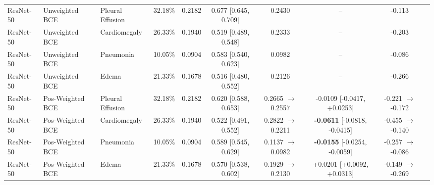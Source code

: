 \documentclass[preprint,12pt]{elsarticle}
\begin{document}
\begin{table}[!htbp]
{\begin{tabular}{lllccccccc}
\midrule
ResNet-50 & Unweighted BCE & Pleural Effusion & 32.18\% & 0.2182 & 0.677 [0.645, 0.709] & 0.2430 & -- & -0.113 \\
ResNet-50 & Unweighted BCE & Cardiomegaly & 26.33\% & 0.1940 & 0.519 [0.489, 0.548] & 0.2333 & -- & -0.203 \\
ResNet-50 & Unweighted BCE & Pneumonia & 10.05\% & 0.0904 & 0.583 [0.540, 0.623] & 0.0982 & -- & -0.086 \\
ResNet-50 & Unweighted BCE & Edema & 21.33\% & 0.1678 & 0.516 [0.480, 0.552] & 0.2126 & -- & -0.266 \\
\midrule
ResNet-50 & Pos-Weighted BCE & Pleural Effusion & 32.18\% & 0.2182 & 0.620 [0.588, 0.653] & 0.2665 $\to$ 0.2557 & -0.0109 [-0.0417, +0.0253] & -0.221 $\to$ -0.172 \\
ResNet-50 & Pos-Weighted BCE & Cardiomegaly & 26.33\% & 0.1940 & 0.522 [0.491, 0.552] & 0.2822 $\to$ 0.2211 & \textbf{-0.0611} [-0.0818, -0.0415] & -0.455 $\to$ -0.140 \\
ResNet-50 & Pos-Weighted BCE & Pneumonia & 10.05\% & 0.0904 & 0.589 [0.545, 0.629] & 0.1137 $\to$ 0.0982 & \textbf{-0.0155} [-0.0254, -0.0059] & -0.257 $\to$ -0.086 \\
ResNet-50 & Pos-Weighted BCE & Edema & 21.33\% & 0.1678 & 0.570 [0.538, 0.602] & 0.1929 $\to$ 0.2130 & +0.0201 [+0.0092, +0.0313] & -0.149 $\to$ -0.269 \\
\bottomrule
\end{tabular}%
}
\end{table}
\end{document}
